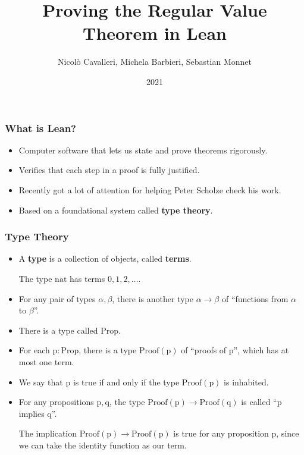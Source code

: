 \documentclass{beamer}
\title{Proving the Regular Value Theorem in Lean}
\author{Nicol\`o Cavalleri, Michela Barbieri, Sebastian Monnet}
\institute{LSGNT}
\date{2021}
\begin{document}
\frame{\titlepage}


\begin{frame}
\frametitle{What is Lean?}
\begin{itemize}
    \item Computer software that lets us state and prove theorems rigorously.
    \pause
    \item Verifies that each step in a proof is fully justified.
    \pause
    \item Recently got a lot of attention for helping Peter Scholze check his work.
    \pause
    \item Based on a foundational system called \textbf{type theory}. 
\end{itemize}
\end{frame}
\begin{frame}
    \frametitle{Type Theory}
    \begin{itemize}
        \item A \textbf{type} is a collection of objects, called \textbf{terms}. 
        \pause
        \begin{example}
            The type $\mathrm{nat}$ has terms $0, 1, 2, \ldots$.
        \end{example}
        \pause
        \item For any pair of types $\alpha, \beta$, there is another type $\alpha \to \beta$ of ``functions from $\alpha$ to $\beta$''.
        \pause
        \item There is a type called $\mathrm{Prop}$. 
        \pause
        \item For each $\mathrm{p} : \mathrm{Prop}$, there is a type $\mathrm{Proof(p)}$ of ``proofs of $\mathrm{p}$'', which has at most one term. 
        \pause
        \item We say that $\mathrm{p}$ is true if and only if the type $\mathrm{Proof(p)}$ is inhabited. 
        \pause
        \item For any propositions $\mathrm{p}, \mathrm{q}$, the type $\mathrm{Proof}(\mathrm{p}) \to \mathrm{Proof}(\mathrm{q})$ is called ``$\mathrm{p}$ implies $\mathrm{q}$''.
        \pause 
        \begin{example}
            The implication $\mathrm{Proof}(\mathrm{p}) \to \mathrm{Proof}(\mathrm{p})$ is true for any proposition $\mathrm{p}$, since we can take the identity function as our term.
        \end{example}
    \end{itemize}

\end{frame}
\end{document}
